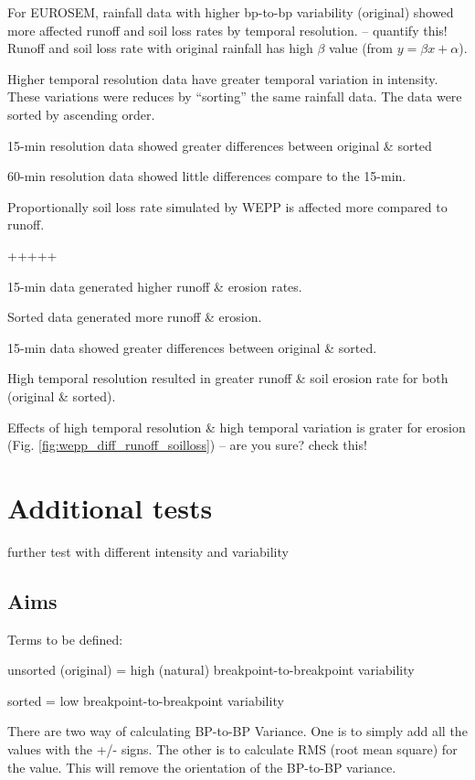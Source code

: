 For EUROSEM,  rainfall data with higher bp-to-bp variability (original) showed
more affected runoff and soil loss rates by temporal resolution. -- quantify
this! Runoff and soil loss rate with original rainfall has high $\beta$ value
(from $y= \beta x + \alpha$).

Higher temporal resolution data have greater temporal variation in intensity.
These variations were reduces by ``sorting'' the same rainfall data. The data
were sorted by ascending order.

15-min resolution data showed greater differences between original \& sorted

60-min resolution data showed little differences compare to the 15-min.

Proportionally soil loss rate simulated by WEPP is affected more compared to
runoff.

+++++

15-min data generated higher runoff \& erosion rates.

Sorted data generated more runoff \& erosion.

15-min data showed greater differences between original \& sorted.

High temporal resolution resulted in greater runoff \& soil erosion rate for
both (original \& sorted).

Effects of high temporal resolution \& high temporal variation is grater for
erosion (Fig. \ref{fig:wepp_diff_runoff_soilloss}) -- are you sure? check this!

\section{Additional tests}
\label{sec:AdditionalTests}

further test with different intensity and variability

\subsection{Aims}
\label{sec:Aims}

Terms to be defined:

unsorted (original) = high (natural) breakpoint-to-breakpoint variability

sorted = low breakpoint-to-breakpoint variability

There are two way of calculating BP-to-BP Variance. One is to simply add all the
values with the +/- signs. The other is to calculate RMS (root mean square) for
the value. This will remove the orientation of the BP-to-BP variance.

